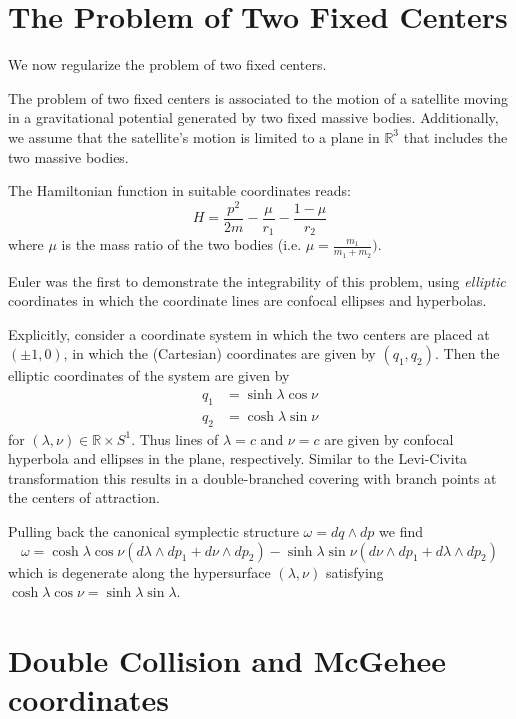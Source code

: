 \section{The Problem of Two Fixed Centers}

We now regularize the problem of two fixed centers. 

The problem of two fixed centers is associated to the motion of a satellite moving in a gravitational potential generated by two fixed massive bodies. Additionally, we assume that the satellite's motion is limited to a plane in $\mathbb{R}^3$ that includes the two massive bodies.

The Hamiltonian function in suitable coordinates reads:
\begin{equation}
    H=\frac{p^2}{2m}-\frac{\mu}{r_1}-\frac{1-\mu}{r_2}
\end{equation}
where $\mu$ is the mass ratio of the two bodies (i.e. $\mu=\frac{m_1}{m_1+m_2})$.

Euler was the first to demonstrate the integrability of this problem, using \emph{elliptic} coordinates in which the coordinate lines are confocal ellipses and hyperbolas.

Explicitly, consider a coordinate system in which the two centers are placed at $(\pm 1, 0)$, in which the (Cartesian) coordinates are given by $(q_1, q_2)$. Then the elliptic coordinates of the system are given by
\begin{align}
q_1&=\sinh\lambda\cos\nu\\
q_2&=\cosh\lambda\sin\nu
\end{align}
for $(\lambda, \nu)\in \mathbb{R}\times S^1$. Thus lines of $\lambda=c$ and $\nu=c$ are given by confocal hyperbola and ellipses in the plane, respectively. Similar to the Levi-Civita transformation this results in a double-branched covering with branch points at the centers of attraction.

Pulling back the canonical symplectic structure $\omega=dq \wedge dp$ we find
\begin{equation}
\omega= \cosh\lambda \cos\nu (d\lambda \wedge dp_1+d\nu \wedge dp_2) -\sinh\lambda\sin\nu(d\nu \wedge dp_1 + d\lambda \wedge d p_2)
\end{equation}
which is degenerate along the hypersurface $(\lambda,\nu)$ satisfying $\cosh\lambda\cos\nu=\sinh\lambda\sin\lambda$.

\section{Double Collision and McGehee coordinates}\label{Sec:Doublecollision}

